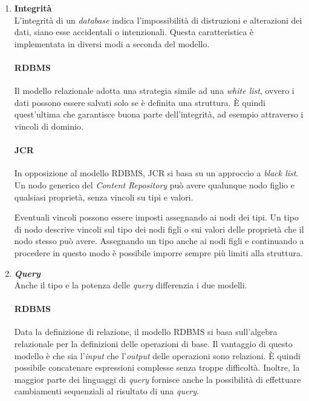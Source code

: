 \begin{enumerate}
				
				
				\item \textbf{Integrità} \\
					L'integrità di un \textit{database} indica l'impossibilità di distruzioni e alterazioni dei dati, siano esse accidentali o intenzionali. Questa caratteristica è implementata in diversi modi a seconda del modello.
					
					\paragraph{RDBMS} 
						Il modello relazionale adotta una strategia simile ad una \textit{white list}, ovvero i dati possono essere salvati solo se è definita una struttura. È quindi quest'ultima che garantisce buona parte dell'integrità, ad esempio attraverso i vincoli di dominio.
					
					
					\paragraph{JCR} 
						In opposizione al modello RDBMS, JCR si basa su un approccio a \textit{black list}. Un nodo generico del \textit{Content Repository} può avere qualunque nodo figlio e qualsiasi proprietà, senza vincoli su tipi e valori.
						
						
						Eventuali vincoli possono essere imposti assegnando ai nodi dei tipi. Un tipo di nodo descrive vincoli sul tipo dei nodi figli o sui valori delle proprietà che il nodo stesso può avere. Assegnando un tipo anche ai nodi figli e continuando a procedere in questo modo è possibile imporre sempre più limiti alla struttura.
						
				\item \textbf{\textit{Query}} \\
					Anche il tipo e la potenza delle \textit{query} differenzia i due modelli.
				
					\paragraph{RDBMS} 
						Data la definizione di relazione, il modello RDBMS si basa sull'algebra relazionale per la definizioni delle operazioni di base. Il vantaggio di questo modello è che sia l'\textit{input} che l'\textit{output} delle operazioni sono relazioni. È quindi possibile concatenare espressioni complesse senza troppe difficoltà. Inoltre, la maggior parte dei linguaggi di \textit{query} fornisce anche la possibilità di effettuare cambiamenti sequenziali al risultato di una \textit{query}.
					

\end{enumerate}
